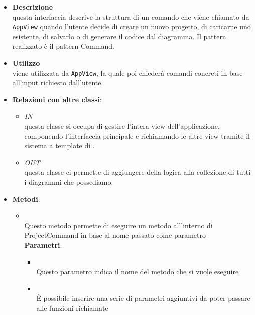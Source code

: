 \label{\nogloxy{swedesigner::client::model::ProjectCommand}}
\begin{itemize}
\item \textbf{Descrizione}\\
questa interfaccia descrive la struttura di un comando che viene chiamato da \texttt{AppView} quando l'utente decide di creare un nuovo progetto, di caricarne uno esistente, di salvarlo o di generare il codice dal diagramma. Il pattern realizzato è il pattern Command.
\item \textbf{Utilizzo}\\
viene utilizzata da \texttt{AppView}, la quale poi chiederà comandi concreti in base all'input richiesto dall'utente.
\item \textbf{Relazioni con altre classi}:
\begin{itemize}
\item \textit{IN} \hyperref[\nogloxy{swedesigner::client::view::AppView}]{}\\
questa classe si occupa di gestire l'intera view dell'applicazione, componendo l'interfaccia principale e richiamando le altre view tramite il sistema a template di \backbonejs{}.
\item \textit{OUT} \hyperref[\nogloxy{swedesigner::client::model::ProjectModel}]{}\\
questa classe ci permette di aggiungere della logica alla collezione di tutti i diagrammi che possediamo.
\end{itemize}
\item \textbf{Metodi}:
\begin{itemize}
\item {}
\\ Questo metodo permette di eseguire un metodo all'interno di ProjectCommand in base al nome passato come parametro
\\ \textbf{Parametri}:
\begin{itemize}
\item {}
\\ Questo parametro indica il nome del metodo che si vuole eseguire
\item {}
\\ È possibile inserire una serie di parametri aggiuntivi da poter passare alle funzioni richiamate
\end{itemize}

\end{itemize}
\end{itemize}
